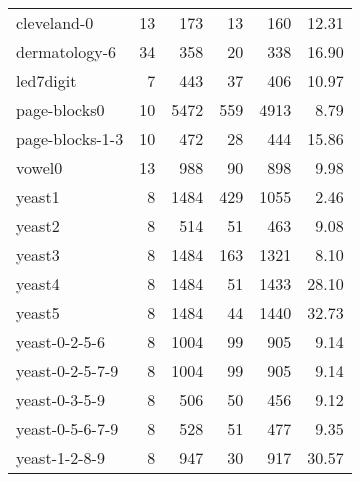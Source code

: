 \documentclass[sort&compress]{elsarticle}
\begin{document}
\begin{table}[!htb]
\begin{tabular}{lrrrrr}
				cleveland-0 &             13 &             173 &                       13 &                      160 &            12.31 \\
				dermatology-6 &             34 &             358 &                       20 &                      338 &            16.90 \\
				led7digit &              7 &             443 &                       37 &                      406 &            10.97 \\
				page-blocks0 &             10 &            5472 &                      559 &                     4913 &             8.79 \\
				page-blocks-1-3 &             10 &             472 &                       28 &                      444 &            15.86 \\
				vowel0 &             13 &             988 &                       90 &                      898 &             9.98 \\
				yeast1 &              8 &            1484 &                      429 &                     1055 &             2.46 \\
				yeast2 &              8 &             514 &                       51 &                      463 &             9.08 \\
				yeast3 &              8 &            1484 &                      163 &                     1321 &             8.10 \\
				yeast4 &              8 &            1484 &                       51 &                     1433 &            28.10 \\
				yeast5 &              8 &            1484 &                       44 &                     1440 &            32.73 \\
				yeast-0-2-5-6 &              8 &            1004 &                       99 &                      905 &             9.14 \\
				yeast-0-2-5-7-9 &              8 &            1004 &                       99 &                      905 &             9.14 \\
				yeast-0-3-5-9 &              8 &             506 &                       50 &                      456 &             9.12 \\
				yeast-0-5-6-7-9 &              8 &             528 &                       51 &                      477 &             9.35 \\
				yeast-1-2-8-9 &              8 &             947 &                       30 &                      917 &            30.57 \\

\end{tabular}
\end{table}
\end{document}
